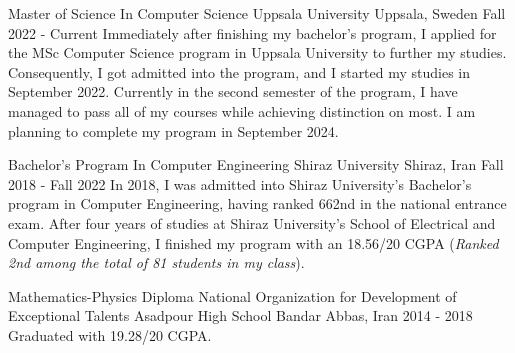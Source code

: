 

\begin{cventries}

  \cventry
    {Master of Science In Computer Science} %
    {Uppsala University} %
    {Uppsala, Sweden} %
    {Fall 2022 - Current} %
    {
        Immediately after finishing my bachelor’s program, I applied for the MSc Computer Science program in Uppsala University to further my studies. Consequently, I got admitted into the program, and I started my studies in September 2022. Currently in the second semester of the program, I have managed to pass all of my courses while achieving distinction on most. I am planning to complete my program in September 2024.
    }
    
  \cventry
    {Bachelor’s Program In Computer Engineering} %
    {Shiraz University} %
    {Shiraz, Iran} %
    {Fall 2018 - Fall 2022} %
    {
        In 2018, I was admitted into Shiraz University’s Bachelor’s program in Computer Engineering, having ranked 662nd in the national entrance exam. After four years of studies at Shiraz University’s School of Electrical and Computer Engineering, I finished my program with an 18.56/20 CGPA (\emph{Ranked 2nd among the total of 81 students in my class}).
    }
    
  \cventry
    {Mathematics-Physics Diploma} %
    {National Organization for Development of Exceptional Talents Asadpour High School} %
    {Bandar Abbas, Iran} %
    {2014 - 2018} %
    {
        Graduated with 19.28/20 CGPA.
    }
\end{cventries}
